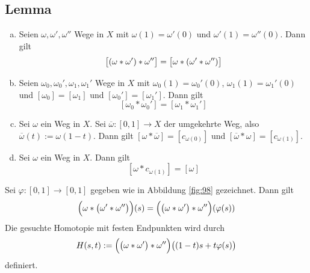 \subsection[Lemma: Eigenschaften des Kompositionsweg als Verknüpfung]{Lemma} %
\label{sub:98}
\begin{enumerate}[a)]
	\item Seien $\omega, \omega', \omega''$ Wege in $X$ mit $\omega(1)= \omega'(0)$ und $\omega'(1)= \omega''(0)$. Dann gilt 
	\[
		\benbrace[\big]{(\omega * \omega') * \omega''} =  \benbrace[\big]{\omega * ( \omega' * \omega'')}
	\]
	\item Seien $\omega_0, \omega_0', \omega_1, \omega_1'$ Wege in $X$ mit $\omega_0(1)= \omega_0'(0)$, $\omega_1(1)= \omega_1'(0)$ und 
	$[\omega_0] = [\omega_1]$ und $[\omega_0'] = [\omega_1']$. Dann gilt
	\[
		[\omega_0 * \omega_0'] = [\omega_1 * \omega_1']
	\]
	\item Sei $\omega$ ein Weg in $X$. Sei $\overline{\omega} : [0,1] \to X $ der umgekehrte Weg, also $\overline{\omega} (t) := \omega(1-t)$. Dann gilt 
	$[\omega * \overline{\omega}] = [c_{\omega(0)}]$ und $[\overline{\omega} * \omega ] = [c_{\omega(1)}]$.
	\item Sei $\omega$ ein Weg in $X$. Dann gilt 
	\[
		[\omega * c_{\omega(1)}] = [\omega]
	\]
\end{enumerate}
\begin{minipage}[t]{0.6\textwidth}
	Sei $\varphi : [0,1] \to [0,1]$ gegeben wie in Abbildung \ref{fig:98} gezeichnet.
	Dann gilt 
	\begin{align*}
		\enbrace[\Big]{\omega * \enbrace[\big]{\omega' * \omega''} }(s) = \enbrace[\Big]{\enbrace[\big]{\omega * \omega'} * \omega''} (\varphi(s))  
	\end{align*}
	Die gesuchte Homotopie mit festen Endpunkten wird durch
	\[
		H(s,t) := \enbrace[\Big]{ \enbrace[\big]{\omega * \omega'} * \omega'' } \enbrace[\big]{(1-t)s + t \varphi(s)}  
	\]
	definiert. \bewende
\end{minipage}
\begin{minipage}[t]{0.5\textwidth}
	\captionsetup{type=figure, skip=4pt, name=Abb.}
\end{minipage}

